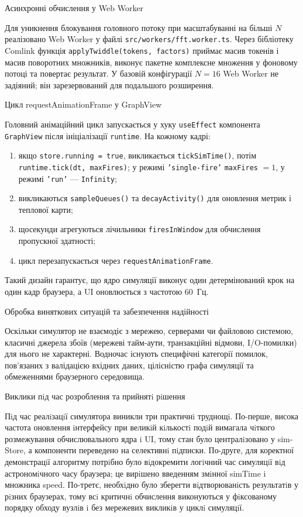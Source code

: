 Асинхронні обчислення у Web Worker

Для уникнення блокування головного потоку при масштабуванні на більші
\(N\) реалізовано Web Worker у файлі \texttt{src/workers/fft.worker.ts}.
Через бібліотеку Comlink функція \texttt{applyTwiddle(tokens,\ factors)}
приймає масив токенів і масив поворотних множників, виконує пакетне
комплексне множення у фоновому потоці та повертає результат. У базовій
конфігурації \(N = 16\) Web Worker не задіяний; він зарезервований для
подальшого розширення.

Цикл requestAnimationFrame у GraphView

Головний анімаційний цикл запускається у хуку \texttt{useEffect}
компонента \texttt{GraphView} після ініціалізації \texttt{runtime}. На
кожному кадрі:

\begin{enumerate}
\def\labelenumi{\arabic{enumi}.}
\item
  якщо \texttt{store.running\ =\ true}, викликається
  \texttt{tickSimTime()}, потім \texttt{runtime.tick(dt,\ maxFires)}; у
  режимі \texttt{’single-fire’} \texttt{maxFires} \(= 1\), у режимі
  \texttt{’run’} --- \texttt{Infinity};
\item
  викликаються \texttt{sampleQueues()} та \texttt{decayActivity()} для
  оновлення метрик і теплової карти;
\item
  щосекунди агрегуються лічильники \texttt{firesInWindow} для обчислення
  пропускної здатності;
\item
  цикл перезапускається через \texttt{requestAnimationFrame}.
\end{enumerate}

Такий дизайн гарантує, що ядро симуляції виконує один детермінований
крок на один кадр браузера, а UI оновлюється з частотою 60~Гц.

\protect{}\label{_Toc229681146}{}Обробка виняткових
ситуацій та забезпечення надійності

Оскільки симулятор не взаємодіє з мережею, серверами чи файловою
системою, класичні джерела збоїв (мережеві тайм-аути, транзакційні
відмови, I/O-помилки) для нього не характерні. Водночас існують
специфічні категорії помилок, пов'язаних з валідацією вхідних даних,
цілісністю графа симуляції та обмеженнями браузерного середовища.

Виклики пiд час розроблення та прийнятi рiшення

Пiд час реалiзацiї симулятора виникли три практичнi труднощi. По-перше,
висока частота оновлення iнтерфейсу при великiй кiлькостi подiй вимагала
чiткого\\
розмежування обчислювального ядра i UI, тому стан було централiзовано у
sim- Store, а компоненти переведено на селективнi пiдписки. По-друге,
для коректної демонстрацiї алгоритму потрiбно було вiдокремити логiчний
час симуляцiї вiд\\
астрономiчного часу браузера; це вирiшено введенням змiнної simTime i
множника speed. По-третє, необхiдно було зберегти вiдтворюванiсть
результатiв у рiзних браузерах, тому всi критичнi обчислення виконуються
у фiксованому порядку обходу вузлiв i без мережевих викликiв у циклi
симуляцiї.

